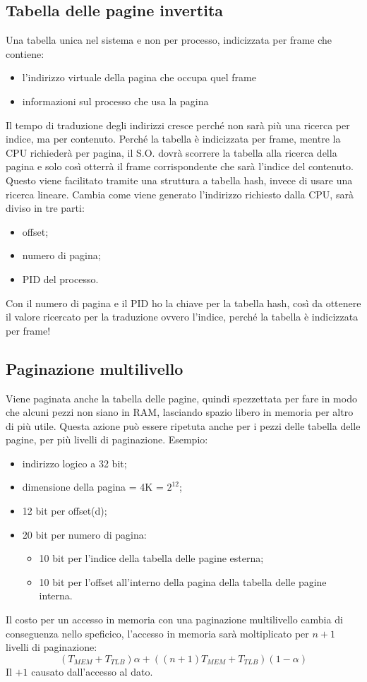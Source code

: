 \documentclass[a4paper, 12pt]{book}
\begin{document}
\subsection{Tabella delle pagine invertita}
Una tabella unica nel sistema e non per processo, indicizzata per frame che contiene:
\begin{itemize}
    \item l'indirizzo virtuale della pagina che occupa quel frame
    \item informazioni sul processo che usa la pagina
\end{itemize}
Il tempo di traduzione degli indirizzi cresce perché non sarà più una ricerca per indice, ma per contenuto. Perché 
la tabella è indicizzata per frame, mentre la CPU richiederà per pagina, il S.O. dovrà scorrere la tabella alla ricerca della 
pagina e solo così otterrà il frame corrispondente che sarà l'indice del contenuto. Questo viene facilitato tramite una struttura 
a tabella hash, invece di usare una ricerca lineare. Cambia come viene generato l'indirizzo richiesto dalla CPU, sarà diviso in tre parti:
\begin{itemize}
    \item offset;
    \item numero di pagina;
    \item PID del processo.
\end{itemize}

Con il numero di pagina e il PID ho la chiave per la tabella hash, così da ottenere il valore ricercato per la traduzione ovvero
l'indice, perché la tabella è indicizzata per frame!

\subsection{Paginazione multilivello}
Viene paginata anche la tabella delle pagine, quindi spezzettata per fare in modo che alcuni pezzi non siano in RAM, lasciando 
spazio libero in memoria per altro di più utile. Questa azione può essere ripetuta anche per i pezzi delle tabella delle pagine, 
per più livelli di paginazione.  Esempio:
\begin{itemize}
    \item indirizzo logico a 32 bit;
    \item dimensione della pagina = 4K = $2^{12}$;
    \item 12 bit per offset(d);
    \item 20 bit per numero di pagina:
    \begin{itemize}
        \item 10 bit per l'indice della tabella delle pagine esterna;
        \item 10 bit per l'offset all'interno della pagina della tabella delle pagine interna.
    \end{itemize}
\end{itemize}
Il costo per un accesso in memoria con una paginazione multilivello cambia di conseguenza nello speficico,
l'accesso in memoria sarà moltiplicato per $n + 1$ livelli di paginazione:
\[
    (T_{MEM} + T_{TLB})\alpha + ((n + 1)T_{MEM} + T_{TLB})(1 - \alpha)
\]
Il $+1$ causato dall'accesso al dato.
\end{document}
